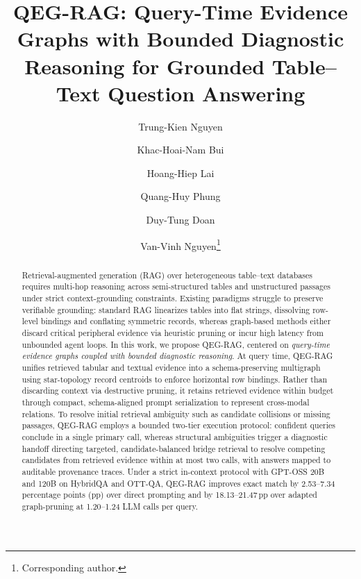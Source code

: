 \documentclass[runningheads]{llncs}
\begin{document}
\title{QEG-RAG: Query-Time Evidence Graphs with Bounded Diagnostic Reasoning for Grounded Table--Text Question Answering}
\author{Trung-Kien Nguyen \and
Khac-Hoai-Nam Bui \and
Hoang-Hiep Lai \and
Quang-Huy Phung \and
Duy-Tung Doan \and
Van-Vinh Nguyen\thanks{Corresponding author.}}
%
%
\maketitle

\begin{abstract}
Retrieval-augmented generation (RAG) over heterogeneous table--text databases requires multi-hop reasoning across semi-structured tables and unstructured passages under strict context-grounding constraints. Existing paradigms struggle to preserve verifiable grounding: standard RAG linearizes tables into flat strings, dissolving row-level bindings and conflating symmetric records, whereas graph-based methods either discard critical peripheral evidence via heuristic pruning or incur high latency from unbounded agent loops. In this work, we propose QEG-RAG, centered on \emph{query-time evidence graphs coupled with bounded diagnostic reasoning}. At query time, QEG-RAG unifies retrieved tabular and textual evidence into a schema-preserving multigraph using star-topology record centroids to enforce horizontal row bindings. Rather than discarding context via destructive pruning, it retains retrieved evidence within budget through compact, schema-aligned prompt serialization to represent cross-modal relations. To resolve initial retrieval ambiguity such as candidate collisions or missing passages, QEG-RAG employs a bounded two-tier execution protocol: confident queries conclude in a single primary call, whereas structural ambiguities trigger a diagnostic handoff directing targeted, candidate-balanced bridge retrieval to resolve competing candidates from retrieved evidence within at most two calls, with answers mapped to auditable provenance traces. Under a strict in-context protocol with GPT-OSS 20B and 120B on HybridQA and OTT-QA, QEG-RAG improves exact match by 2.53--7.34 percentage points (pp) over direct prompting and by 18.13--21.47\,pp over adapted graph-pruning at 1.20--1.24 LLM calls per query.

\end{abstract}
\end{document}
